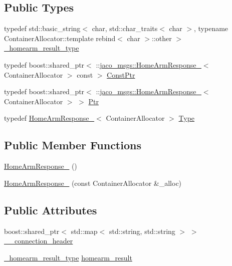 \subsection*{Public Types}
\begin{DoxyCompactItemize}
\item 
typedef std\+::basic\+\_\+string$<$ char, std\+::char\+\_\+traits$<$ char $>$, typename Container\+Allocator\+::template rebind$<$ char $>$\+::other $>$ \hyperlink{structjaco__msgs_1_1HomeArmResponse___aca787aa960164fab78282b0f84b6d636}{\+\_\+homearm\+\_\+result\+\_\+type}
\item 
typedef boost\+::shared\+\_\+ptr$<$ \+::\hyperlink{structjaco__msgs_1_1HomeArmResponse__}{jaco\+\_\+msgs\+::\+Home\+Arm\+Response\+\_\+}$<$ Container\+Allocator $>$ const  $>$ \hyperlink{structjaco__msgs_1_1HomeArmResponse___a3ea69e441416b51b1be0a08085a75de9}{Const\+Ptr}
\item 
typedef boost\+::shared\+\_\+ptr$<$ \+::\hyperlink{structjaco__msgs_1_1HomeArmResponse__}{jaco\+\_\+msgs\+::\+Home\+Arm\+Response\+\_\+}$<$ Container\+Allocator $>$ $>$ \hyperlink{structjaco__msgs_1_1HomeArmResponse___a09088b3e8e0ceec2cfba7a8af421b6a5}{Ptr}
\item 
typedef \hyperlink{structjaco__msgs_1_1HomeArmResponse__}{Home\+Arm\+Response\+\_\+}$<$ Container\+Allocator $>$ \hyperlink{structjaco__msgs_1_1HomeArmResponse___a45275577566d0460a221081eb55d1dc7}{Type}
\end{DoxyCompactItemize}
\subsection*{Public Member Functions}
\begin{DoxyCompactItemize}
\item 
\hyperlink{structjaco__msgs_1_1HomeArmResponse___ad4386054a190abe60a3e3ceec9a03067}{Home\+Arm\+Response\+\_\+} ()
\item 
\hyperlink{structjaco__msgs_1_1HomeArmResponse___a25164c606346dfcaaacc74c6e62e7fee}{Home\+Arm\+Response\+\_\+} (const Container\+Allocator \&\+\_\+alloc)
\end{DoxyCompactItemize}
\subsection*{Public Attributes}
\begin{DoxyCompactItemize}
\item 
boost\+::shared\+\_\+ptr$<$ std\+::map$<$ std\+::string, std\+::string $>$ $>$ \hyperlink{structjaco__msgs_1_1HomeArmResponse___a40834087fc7a368d388f368c9b000285}{\+\_\+\+\_\+connection\+\_\+header}
\item 
\hyperlink{structjaco__msgs_1_1HomeArmResponse___aca787aa960164fab78282b0f84b6d636}{\+\_\+homearm\+\_\+result\+\_\+type} \hyperlink{structjaco__msgs_1_1HomeArmResponse___a2efd00ce949c689141e24a0c2feac589}{homearm\+\_\+result}
\end{DoxyCompactItemize}


